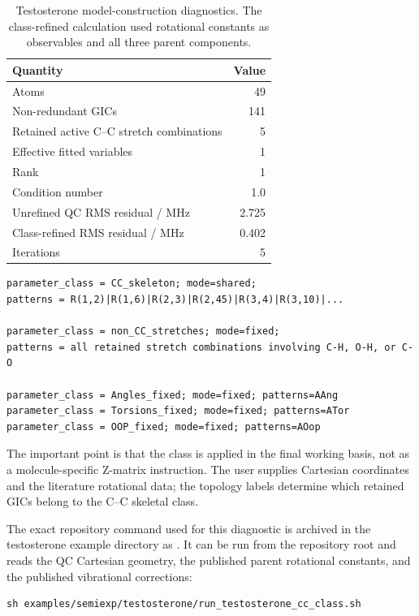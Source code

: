 \documentclass[12pt]{article}
\begin{document}
\begin{table}
\caption{Testosterone model-construction diagnostics. The class-refined
calculation used rotational constants as observables and all three parent
components.}
\label{tab:si-testosterone-diagnostics}
\begin{tabular}{lr}
\toprule
Quantity & Value \\
\midrule
Atoms & 49 \\
Non-redundant GICs & 141 \\
Retained active C--C stretch combinations & 5 \\
Effective fitted variables & 1 \\
Rank & 1 \\
Condition number & 1.0 \\
Unrefined QC RMS residual / MHz & 2.725 \\
Class-refined RMS residual / MHz & 0.402 \\
Iterations & 5 \\
\bottomrule
\end{tabular}
\end{table}

\begin{lstlisting}
parameter_class = CC_skeleton; mode=shared;
patterns = R(1,2)|R(1,6)|R(2,3)|R(2,45)|R(3,4)|R(3,10)|...

parameter_class = non_CC_stretches; mode=fixed;
patterns = all retained stretch combinations involving C-H, O-H, or C-O

parameter_class = Angles_fixed; mode=fixed; patterns=AAng
parameter_class = Torsions_fixed; mode=fixed; patterns=ATor
parameter_class = OOP_fixed; mode=fixed; patterns=AOop
\end{lstlisting}

The important point is that the class is applied in the final working basis,
not as a molecule-specific Z-matrix instruction. The user supplies Cartesian
coordinates and the literature rotational data; the topology labels determine
which retained GICs belong to the C--C skeletal class.

The exact repository command used for this diagnostic is archived in the
testosterone example directory as . It can be
run from the repository root and reads the QC Cartesian geometry, the
published parent rotational constants, and the published vibrational
corrections:
\begin{lstlisting}
sh examples/semiexp/testosterone/run_testosterone_cc_class.sh
\end{lstlisting}
\end{document}
